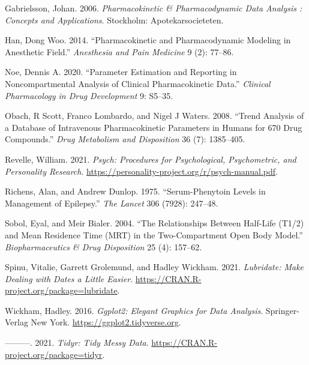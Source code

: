 \documentclass[
  11pt,
  krantz2, a4paper, twoside]{krantz}
\newlength{\cslhangindent}
\newlength{\cslentryspacingunit} %
\newenvironment{CSLReferences}[2] %
 {%
  \setlength{\parindent}{0pt}
  \ifodd #1
  \let\oldpar\par
  \def\par{\hangindent=\cslhangindent\oldpar}
  \fi
  \setlength{\parskip}{#2\cslentryspacingunit}
 }%
 {}
\theoremstyle{definition}
\theoremstyle{definition}
\theoremstyle{definition}
\theoremstyle{definition}
\theoremstyle{remark}
\begin{document}
\begin{CSLReferences}{1}{0}
\leavevmode{}%
Gabrielsson, Johan. 2006. \emph{Pharmacokinetic \& Pharmacodynamic Data Analysis : Concepts and Applications}. Stockholm: Apotekarsocieteten.

\leavevmode{}%
Han, Dong Woo. 2014. {``Pharmacokinetic and Pharmacodynamic Modeling in Anesthetic Field.''} \emph{Anesthesia and Pain Medicine} 9 (2): 77--86.

\leavevmode{}%
Noe, Dennis A. 2020. {``Parameter Estimation and Reporting in Noncompartmental Analysis of Clinical Pharmacokinetic Data.''} \emph{Clinical Pharmacology in Drug Development} 9: S5--35.

\leavevmode{}%
Obach, R Scott, Franco Lombardo, and Nigel J Waters. 2008. {``Trend Analysis of a Database of Intravenous Pharmacokinetic Parameters in Humans for 670 Drug Compounds.''} \emph{Drug Metabolism and Disposition} 36 (7): 1385--405.

\leavevmode{}%
Revelle, William. 2021. \emph{Psych: Procedures for Psychological, Psychometric, and Personality Research}. \url{https://personality-project.org/r/psych-manual.pdf}.

\leavevmode{}%
Richens, Alan, and Andrew Dunlop. 1975. {``Serum-Phenytoin Levels in Management of Epilepsy.''} \emph{The Lancet} 306 (7928): 247--48.

\leavevmode{}%
Sobol, Eyal, and Meir Bialer. 2004. {``The Relationships Between Half-Life (T1/2) and Mean Residence Time (MRT) in the Two-Compartment Open Body Model.''} \emph{Biopharmaceutics \& Drug Disposition} 25 (4): 157--62.

\leavevmode{}%
Spinu, Vitalie, Garrett Grolemund, and Hadley Wickham. 2021. \emph{Lubridate: Make Dealing with Dates a Little Easier}. \url{https://CRAN.R-project.org/package=lubridate}.

\leavevmode{}%
Wickham, Hadley. 2016. \emph{Ggplot2: Elegant Graphics for Data Analysis}. Springer-Verlag New York. \url{https://ggplot2.tidyverse.org}.

\leavevmode{}%
---------. 2021. \emph{Tidyr: Tidy Messy Data}. \url{https://CRAN.R-project.org/package=tidyr}.


\end{CSLReferences}
\end{document}
